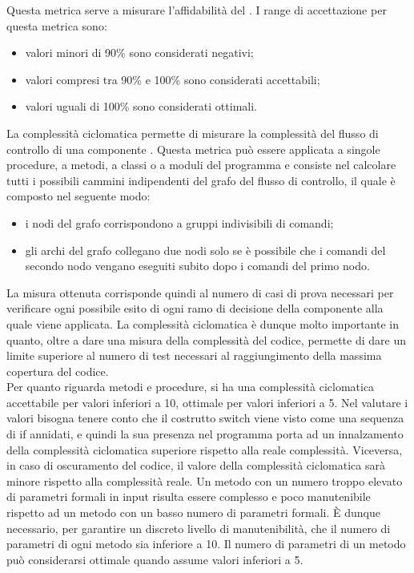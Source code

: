 					Questa metrica serve a misurare l'affidabilità del .
					I range di accettazione per questa metrica sono:
					\begin{itemize}
					\item valori minori di 90\% sono considerati negativi;
					\item valori compresi tra 90\% e 100\% sono considerati accettabili;
					\item valori uguali di 100\% sono considerati ottimali.
					\end{itemize}
				La complessità ciclomatica permette di misurare la complessità del flusso di controllo di una componente . Questa metrica può essere applicata a singole procedure, a metodi, a classi o a moduli del programma e consiste nel calcolare tutti i possibili cammini indipendenti del grafo del flusso di controllo, il quale è composto nel seguente modo:
				\begin{itemize}
					\item i nodi del grafo corrispondono a gruppi indivisibili di comandi;
					\item gli archi del grafo collegano due nodi solo se è possibile che i comandi del secondo nodo vengano eseguiti subito dopo i comandi del primo nodo.
				\end{itemize}
				La misura ottenuta corrisponde quindi al numero di casi di prova necessari per verificare ogni possibile esito di ogni ramo di decisione della componente alla quale viene applicata. La complessità ciclomatica è dunque molto importante in quanto, oltre a dare una misura della complessità del codice, permette di dare un limite superiore al numero di test necessari al raggiungimento della massima copertura del codice.\\
Per quanto riguarda metodi e procedure, si ha una complessità ciclomatica accettabile per valori inferiori a 10, ottimale per valori inferiori a 5. Nel valutare i valori bisogna tenere conto che il costrutto switch viene visto come una sequenza di if annidati, e quindi la sua presenza nel programma porta ad un innalzamento della complessità ciclomatica superiore rispetto alla reale complessità. Viceversa, in caso di oscuramento del codice, il valore della complessità ciclomatica sarà minore rispetto alla complessità reale.
			Un metodo con un numero troppo elevato di parametri formali in input risulta essere complesso e poco manutenibile rispetto ad un metodo con un basso numero di parametri formali. È dunque necessario, per garantire un discreto livello di manutenibilità, che il numero di parametri di ogni metodo sia inferiore a 10. Il numero di parametri di un metodo può considerarsi ottimale quando assume valori inferiori a 5.
